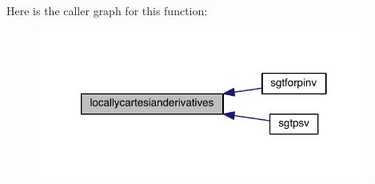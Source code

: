 Here is the caller graph for this function\-:\nopagebreak
\begin{figure}[H]
\begin{center}
\leavevmode
\includegraphics[width=310pt]{others_8f90_a0aaa3f2ed2133f41229688450207bbac_icgraph}
\end{center}
\end{figure}


